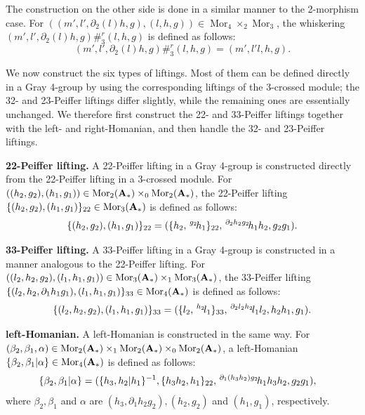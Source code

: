 \documentclass[11pt, reqno]{amsart} %
\newcommand{\act}[1]{\,\sp{#1}\!}
\newcommand{\del}{\partial}
\newcommand{\mor}{{\mathop{\mathrm{Mor}}}}
\theoremstyle{definition}
\theoremstyle{remark}
\numberwithin{equation}{section}
\begin{document}
The construction on the other side is done in a similar manner to the 2-morphism case. 
For $\left( (m',l',\del_2(l)h,g),  (l,h, g)  \right)\in \mor_4 \times_2 \mor_3$, the whiskering $(m',l',\del_2(l)h,g) \#^r_3  (l,h, g)$ is defined as follows:
\[
(m',l',\del_2(l)h,g) \#^r_3  (l,h, g) = (m', l'l,h,g).
\]


We now construct the six types of liftings. Most of them can be defined directly in a Gray 4-group by using the corresponding liftings of the 3-crossed module; the 32- and 23-Peiffer liftings differ slightly, while the remaining ones are essentially unchanged. We therefore first construct the 22- and 33-Peiffer liftings together with the left- and right-Homanian, and then handle the 32- and 23-Peiffer liftings.

\vspace{.5em}
\noindent
{\bf 22-Peiffer lifting.} A 22-Peiffer lifting in a Gray 4-group is constructed directly from the 22-Peiffer lifting in a 3-crossed module. For $((h_2, g_2),(h_1, g_1))\in \mor_2({\bf A_*}) \times_0 \mor_2({\bf A_*}) $, the 22-Peiffer lifting $\{(h_2, g_2), (h_1, g_1)\}_{22} \in \mor_3({\bf A_*})$ is defined as follows:
\[
\{(h_2, g_2), (h_1, g_1)\}_{22} = ( \{h_2,\act{g_2}h_1\}_{22},\act{\del_2 h_2 g_2}h_1h_2,g_2g_1).
\]

\vspace{.5em}
\noindent
{\bf 33-Peiffer lifting.} A 33-Peiffer lifting in a Gray 4-group is constructed in a manner analogous to the 22-Peiffer lifting. For $((l_2,h_2, g_2),(l_1,h_1, g_1))\in \mor_3({\bf A_*}) \times_1 \mor_3({\bf A_*}) $, the 33-Peiffer lifting $\{(l_2, h_2, \del_1h_1 g_1), (l_1, h_1, g_1)\}_{33} \in \mor_4({\bf A_*})$ is defined as follows:
\[
\{(l_2, h_2, g_2), (l_1, h_1, g_1)\}_{33} = (\{l_2, \act{h_2}l_1 \}_{33} ,\act{\del_2 l_2h_2}l_1l_2,h_2h_1, g_1).
\]

\vspace{.5em}
\noindent
{\bf left-Homanian.} A left-Homanian is constructed in the same way. For $(\beta_2,\beta_1,\alpha)\in \mor_2({\bf A_*}) \times_1 \mor_2({\bf A_*}) \times_0 \mor_2({\bf A_*}) $, a left-Homanian $\{\beta_2,\beta_1|\alpha\} \in \mor_4({\bf A_*})$ is defined as follows:
\begin{align*}
\{\beta_2,\beta_1|\alpha\}
&= (\{h_3,h_2 | h_1\}^{-1},\{h_3h_2, h_1\}_{22},\act{\del_1(h_3h_2)g_2}h_1h_3h_2,g_2g_1),
\end{align*}
where $\beta_2,\beta_1$ and $\alpha$ are $(h_3, \del_1h_2 g_2),(h_2, g_2) $ and $ (h_1, g_1)$, respectively.
\end{document}

